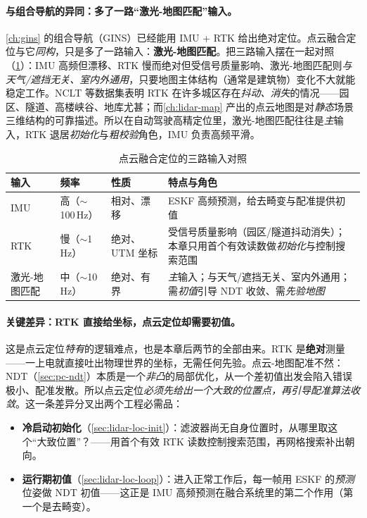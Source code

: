 \paragraph{与组合导航的异同：多了一路“激光-地图匹配”输入。}
\cref{ch:gins} 的组合导航（GINS）已经能用 IMU + RTK 给出绝对定位。点云融合定位与它\emph{同构}，只是多了一路输入：\textbf{激光-地图匹配}。把三路输入摆在一起对照（\cref{tab:lidar-loc-inputs}）：IMU 高频但漂移、RTK 慢而绝对但受信号质量影响、激光-地图匹配则\emph{与天气/遮挡无关、室内外通用}，只要地图主体结构（通常是建筑物）变化不大就能稳定工作。NCLT 等数据集表明 RTK 在许多城区存在\emph{抖动、消失}的情况——园区、隧道、高楼峡谷、地库尤甚；而\cref{ch:lidar-map} 产出的点云地图是对\emph{静态}场景三维结构的可靠描述。所以在自动驾驶高精定位里，激光-地图匹配往往是\emph{主}输入，RTK 退居\emph{初始化}与\emph{粗校验}角色，IMU 负责高频平滑。

\begin{table}[H]\centering\small
\caption{点云融合定位的三路输入对照}
\label{tab:lidar-loc-inputs}
\begin{tabular}{p{} p{} p{} p{}}
\toprule
输入 & 频率 & 性质 & 特点与角色 \\
\midrule
IMU & 高（$\sim$100\,Hz） & 相对、漂移 & ESKF 高频预测，给去畸变与配准提供初值 \\
RTK & 慢（$\sim$1\,Hz） & 绝对、UTM 坐标 & 受信号质量影响（园区/隧道抖动消失）；本章只用首个有效读数做\emph{初始化}与控制搜索范围 \\
激光-地图匹配 & 中（$\sim$10\,Hz） & 绝对、有界 & \emph{主}输入；与天气/遮挡无关、室内外通用；需\emph{初值}引导 NDT 收敛、需\emph{先验地图} \\
\bottomrule
\end{tabular}
\end{table}

\paragraph{关键差异：RTK 直接给坐标，点云定位却需要初值。}
这是点云定位\emph{特有}的逻辑难点，也是本章后两节的全部由来。RTK 是\textbf{绝对}测量——一上电就直接吐出物理世界的坐标，无需任何先验。点云-地图配准不然：NDT（\cref{sec:pc-ndt}）本质是一个\emph{非凸}的局部优化，从一个差初值出发会陷入错误极小、配准发散。所以点云定位\emph{必须先给出一个大致的位置点，再引导配准算法收敛}。这一条差异分叉出两个工程必需品：
\begin{itemize}
  \item \textbf{冷启动初始化}（\cref{sec:lidar-loc-init}）：滤波器尚无自身位置时，从哪里取这个“大致位置”？——用首个有效 RTK 读数控制搜索范围，再网格搜索补出朝向。
  \item \textbf{运行期初值}（\cref{sec:lidar-loc-loop}）：进入正常工作后，每一帧用 ESKF 的\emph{预测}位姿做 NDT 初值——这正是 IMU 高频预测在融合系统里的第二个作用（第一个是去畸变）。
\end{itemize}

